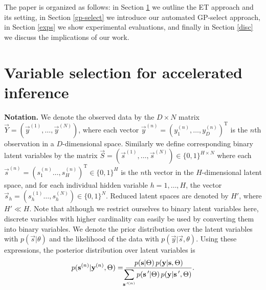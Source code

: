 
The paper is organized as follows: 
in Section \ref{method} we outline the ET approach and its setting, in Section \ref{gp-select} we introduce our automated GP-select approach, in Section \ref{exps} we show experimental evaluations, and finally in Section \ref{disc} we discuss the implications of our work.

\section{Variable selection for accelerated inference}
\label{method}
%
\textbf{Notation.}
We denote the observed data by the $D\times N$ matrix $\vec{Y}=(\vec{y}^{(1)}, \dots, \vec{y}^{(N)})$, where each vector $\vec{y}^{(n)} = ( y_1^{(n)}, \dots, y_D^{(n)})^\mathrm{T}$ is the $n$th observation 
in a $D$-dimensional space.
Similarly we define corresponding 
binary latent variables 
by the matrix $\vec{S} = (\vec{s}^{(1)}, \dots, \vec{s}^{(N)})\in \{0,1\}^{H \times N}$ 
where each $\vec{s}^{(n)}=(s_1^{(n)}\dots, s^{(n)}_H)^\mathrm{T} \in \{0,1\}^{H}$ is the $n$th vector in the $H$-dimensional latent space,
and for each individual hidden variable $h=1,\dots,H$, the vector $\vec{s}_h=(s_h^{(1)}\dots, s^{(N)}_h)\in \{0,1\}^{N}$. 
Reduced latent spaces are denoted by $H'$, where $H' \ll H$. 
Note that although we restrict ourselves to binary latent variables here, discrete variables with higher cardinality can easily be used by converting them into binary variables.
We denote the prior distribution over the latent variables with $p(\vec{s} | \theta)$ 
and the likelihood of the data with $p(\vec{y} | \vec{s}, \theta)$.
Using these expressions, the posterior distribution over latent variables is 
%
\vspace{-.1cm}
\begin{equation}
\label{eq:post}
p({\mathbf{s}}^{(n)}|{\mathbf{y}}^{(n)},\Theta)  = \frac{p({\mathbf{s}} | \Theta) \, p({\mathbf{y}} | {\mathbf{s}}, \Theta)}
{\displaystyle\hspace{-1.5mm}\sum_{{\mathbf{s}}\,'^{(n)}} p({\mathbf{s}}\,' | \Theta) \, p({\mathbf{y}} | {\mathbf{s}}\,', \Theta)}.
\end{equation}
\vspace{-.5cm}


